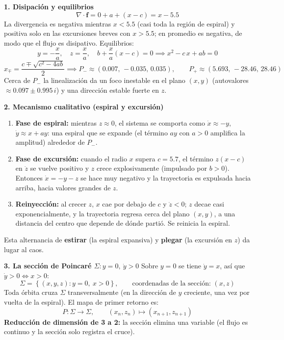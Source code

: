 \documentclass[11pt,a4paper]{article}
\newenvironment{solucion}[1][Solución Detallada]{%
    \vspace{1.5mm}%
    \noindent{\large\textbf{Solución:}}\par\vspace{1.5mm}%
}{%
    \par\vspace{3mm}%
}
\begin{document}
\begin{solucion}

\textbf{\large 1. Disipación y equilibrios}
\[
\nabla\cdot\mathbf{f} = 0 + a + (x - c) = x - 5.5
\]
La divergencia es negativa mientras $x < 5.5$ (casi toda la región de espiral) y positiva solo en las excursiones breves con $x > 5.5$; en promedio es negativa, de modo que el flujo es disipativo. Equilibrios:
\[
y = -\frac{x}{a},\quad z = \frac{x}{a}, \quad b + \frac{x}{a}(x - c) = 0 \implies x^2 - c\,x + ab = 0
\]
\[
x_{\mp} = \frac{c \mp \sqrt{c^2 - 4ab}}{2} \implies P_- \approx (0.007,\,-0.035,\,0.035), \qquad P_+ \approx (5.693,\,-28.46,\,28.46)
\]
Cerca de $P_-$ la linealización da un foco inestable en el plano $(x, y)$ (autovalores $\approx 0.097 \pm 0.995\, i$) y una dirección estable fuerte en $z$.

\vspace{3.5mm}

\textbf{\large 2. Mecanismo cualitativo (espiral y excursión)}
\begin{enumerate}[label=\textbf{(\roman*)}, leftmargin=2.5em]
    \item \textbf{Fase de espiral:} mientras $z \approx 0$, el sistema se comporta como $\dot{x} \approx -y$, $\dot{y} \approx x + ay$: una espiral que se expande (el término $ay$ con $a>0$ amplifica la amplitud) alrededor de $P_-$.
    \item \textbf{Fase de excursión:} cuando el radio $x$ supera $c = 5.7$, el término $z(x - c)$ en $\dot{z}$ se vuelve positivo y $z$ crece explosivamente (impulsado por $b > 0$). Entonces $\dot{x} = -y - z$ se hace muy negativo y la trayectoria es expulsada hacia arriba, hacia valores grandes de $z$.
    \item \textbf{Reinyección:} al crecer $z$, $x$ cae por debajo de $c$ y $\dot{z}<0$; $z$ decae casi exponencialmente, y la trayectoria regresa cerca del plano $(x,y)$, a una distancia del centro que depende de dónde partió. Se reinicia la espiral.
\end{enumerate}
Esta alternancia de \textbf{estirar} (la espiral expansiva) y \textbf{plegar} (la excursión en $z$) da lugar al caos.

\vspace{3.5mm}

\textbf{\large 3. La sección de Poincaré $\Sigma: y = 0,\ \dot{y} > 0$}
Sobre $y = 0$ se tiene $\dot{y} = x$, así que $\dot y > 0 \iff x > 0$:
\[
\Sigma = \left\{(x, y, z) : y = 0,\ x > 0\right\}, \qquad \text{coordenadas de la sección: } (x, z)
\]
Toda órbita cruza $\Sigma$ transversalmente (en la dirección de $y$ creciente, una vez por vuelta de la espiral). El mapa de primer retorno es:
\[
P: \Sigma \to \Sigma, \qquad (x_n, z_n) \mapsto (x_{n+1}, z_{n+1})
\]
\textbf{Reducción de dimensión de 3 a 2:} la sección elimina una variable (el flujo es continuo y la sección solo registra el cruce).


\end{solucion}
\end{document}
